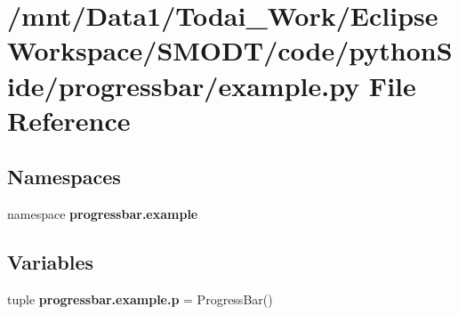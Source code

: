 \section{/mnt/\-Data1/\-Todai\-\_\-\-Work/\-Eclipse\-Workspace/\-S\-M\-O\-D\-T/code/python\-Side/progressbar/example.py File Reference}
\label{example_8py}
\subsection*{Namespaces}
\begin{DoxyCompactItemize}
\item 
namespace {\bf progressbar.\-example}
\end{DoxyCompactItemize}
\subsection*{Variables}
\begin{DoxyCompactItemize}
\item 
tuple {\bf progressbar.\-example.\-p} = Progress\-Bar()
\end{DoxyCompactItemize}
